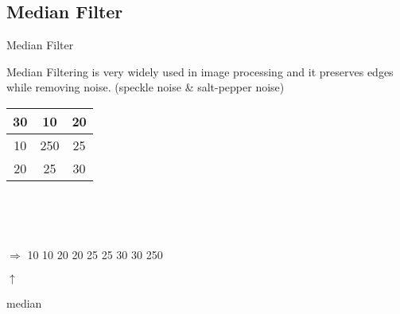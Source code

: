 \documentclass{beamer}
\begin{document}
\subsection{Median Filter}
\begin{frame}{Median Filter}

Median Filtering is very widely used in image processing and it preserves edges while removing noise. (speckle noise \& salt-pepper noise)




\vspace{2cm}

\begin{tabular}{|c|c|c|}  
	\hline 
	30 & 10 & 20 \\ 
	\hline                    
	10 & 250 & 25 \\ 
	\hline 
	20 & 25 & 30 \\ 
	\hline 
\end{tabular} 

\

\

$\Rightarrow$ 10 10 20 20 25 25 30 30 250 

\hspace{26mm}$\uparrow$

\hspace{20mm} median
\end{frame}
\end{document}
